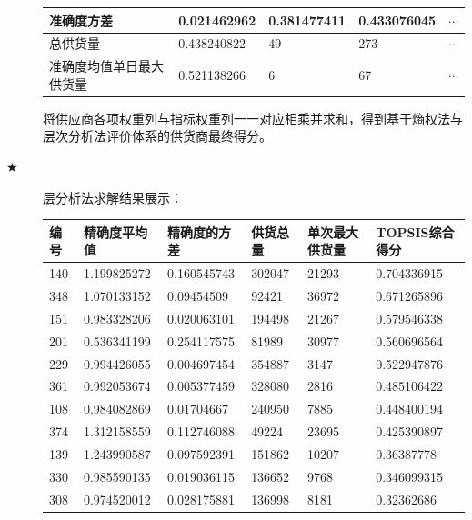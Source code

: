 \documentclass{cumcmthesis}
\begin{document}
\begin{description}
\begin{table}[htbp]
\begin{tabular}{|l|l|l|l|l|}
                \hline
                准确度方差               & 0.021462962 & 0.381477411 & 0.433076045 & $\cdots$ \\
                \hline
                总供货量                 & 0.438240822 & 49          & 273         & $\cdots$ \\
                \hline
                准确度均值单日最大供货量 & 0.521138266 & 6           & 67          & $\cdots$ \\
                \hline
            \end{tabular}
        \end{table}
        将供应商各项权重列与指标权重列一一对应相乘并求和，得到基于熵权法与层次分析法评价体系的供货商最终得分。

    \item[$\bigstar$] 层分析法求解结果展示：
        \begin{longtable}{l|llll|l}
            \toprule
            编号 & 精确度平均值 & 精确度的方差 & 供货总量 & 单次最大供货量 & TOPSIS综合得分 \\
            \midrule
            140  & 1.199825272  & 0.160545743  & 302047   & 21293          & 0.704336915    \\
            348  & 1.070133152  & 0.09454509   & 92421    & 36972          & 0.671265896    \\
            151  & 0.983328206  & 0.020063101  & 194498   & 21267          & 0.579546338    \\
            201  & 0.536341199  & 0.254117575  & 81989    & 30977          & 0.560696564    \\
            229  & 0.994426055  & 0.004697454  & 354887   & 3147           & 0.522947876    \\
            361  & 0.992053674  & 0.005377459  & 328080   & 2816           & 0.485106422    \\
            108  & 0.984082869  & 0.01704667   & 240950   & 7885           & 0.448400194    \\
            374  & 1.312158559  & 0.112746088  & 49224    & 23695          & 0.425390897    \\
            139  & 1.243990587  & 0.097592391  & 151862   & 10207          & 0.36387778     \\
            330  & 0.985590135  & 0.019036115  & 136652   & 9768           & 0.346099315    \\
            308  & 0.974520012  & 0.028175881  & 136998   & 8181           & 0.32362686     \\

\end{longtable}
\end{description}
\end{document}
